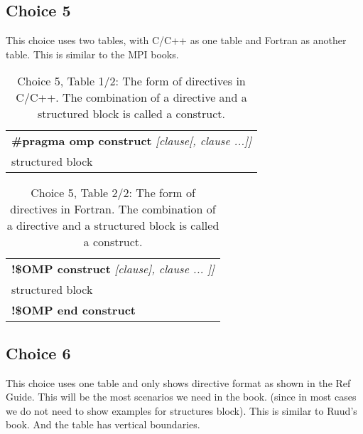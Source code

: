 \subsection{Choice 5}

This choice uses two tables, with C/C++ as one table and Fortran as 
another table.  This is similar to the MPI books.

\begin{table}[h!]
\centering
\caption{Choice 5, Table 1/2: The form of directives in C/C++.  The 
combination of a directive and a structured 
block is called a construct.}
\label{fig:choice5-1}
\begin{tabular}{|l|}
\hline
\textbf{\#pragma omp construct} \textit{[clause[, clause ...]]}    \\                               
\hspace{5mm} structured block \\
\hline

\end{tabular}
\end{table}


\begin{table}[h!]
\centering
\caption{Choice 5, Table 2/2: The form of directives in Fortran.  The 
combination of a directive and a structured 
block is called a construct.}
\label{fig:choice5-2}
\begin{tabular}{|l|}
\hline
\textbf{!\$OMP construct} \textit{ [clause], clause ... ]]}   \\
\hspace{5mm} structured block \\
\textbf{!\$OMP end construct} \\                               
\hline
 

\end{tabular}
\end{table}




\subsection{Choice 6}

This choice uses one table and only shows directive format as shown in the
 Ref Guide. This will be the most scenarios we need in the book. (since in 
 most cases we do not need to show examples for structures block).  This is 
 similar to Ruud's book. 
And the table has vertical boundaries.


